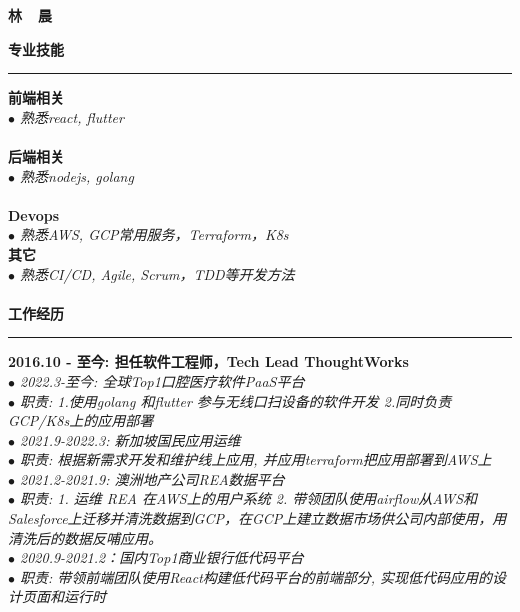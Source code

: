 \documentclass[a3paper,12pt,final]{memoir}
\newcommand{\myThemeColor}{RoyalBlue}
\newcommand{\SmallSep}{\vspace{0.9em}}
\newcommand{\CVSection}[1]
	{\Large\textbf{#1}\par
	\vspace{0.2cm}\normalsize\normalfont}
\newcommand{\CVItem}[1]
	{\textbf{\color{\myThemeColor} #1}}
\begin{document}
\begin{CJK*}{UTF8}{gbsn}
\begin{flushright}
\end{flushright}\normalsize
\framebreak


\Huge\bfseries {\color{\myThemeColor} 林~~晨}\\
\normalsize\normalfont

\CVSection{专业技能}
\hrule
\SmallSep
\CVItem{前端相关}\\
\textit{$\bullet$ 熟悉react, flutter} \\
\\
\CVItem{后端相关}\\
\textit{$\bullet$ 熟悉nodejs, golang} \\
\\
\CVItem{Devops}\\
\textit{$\bullet$ 熟悉AWS, GCP常用服务，Terraform，K8s}\\

\CVItem{其它}\\
\textit{$\bullet$ 熟悉CI/CD, Agile, Scrum，TDD等开发方法}\\
\\

\CVSection{工作经历}
\hrule
\SmallSep
\CVItem{2016.10 - 至今: 担任软件工程师，Tech Lead \hfill ThoughtWorks}\\

\textit{$\bullet$ 2022.3-至今: 全球Top1口腔医疗软件PaaS平台} \\
\textit{$\bullet$ 职责: 1.使用golang 和flutter 参与无线口扫设备的软件开发 2.同时负责GCP/K8s上的应用部署 }\\

\textit{$\bullet$ 2021.9-2022.3: 新加坡国民应用运维} \\
\textit{$\bullet$ 职责: 根据新需求开发和维护线上应用, 并应用terraform把应用部署到AWS上}\\

\textit{$\bullet$ 2021.2-2021.9: 澳洲地产公司REA数据平台} \\
\textit{$\bullet$ 职责:
  1. 运维 REA 在AWS上的用户系统
  2. 带领团队使用airflow从AWS和Salesforce上迁移并清洗数据到GCP，在GCP上建立数据市场供公司内部使用，用清洗后的数据反哺应用。}\\

\textit{$\bullet$ 2020.9-2021.2：国内Top1商业银行低代码平台} \\
\textit{$\bullet$ 职责: 带领前端团队使用React构建低代码平台的前端部分, 实现低代码应用的设计页面和运行时} \\


\end{CJK*}
\end{document}
